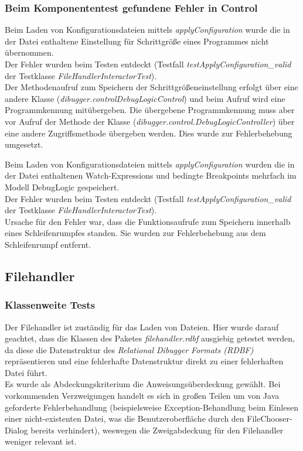 \documentclass[parskip=full]{scrartcl}
\begin{document}
\subsubsection{Beim Komponententest gefundene Fehler in Control}\label{fehlerInControl}
Beim Laden von Konfigurationsdateien mittels \textit{applyConfiguration} wurde die in der Datei enthaltene Einstellung für Schrittgröße eines Programmes nicht übernommen.\\
Der Fehler wurden beim Testen entdeckt (Testfall \textit{testApplyConfiguration\_valid} der Testklasse \textit{FileHandlerInteractorTest}).\\
Der Methodenaufruf zum Speichern der Schrittgrößeneinstellung erfolgt über eine andere Klasse (\textit{dibugger.controlDebugLogicControl}) und beim Aufruf wird eine Programmkennung mitübergeben.
Die übergebene Programmkennung muss aber vor Aufruf der Methode der Klasse (\textit{dibugger.control.DebugLogicController}) über eine andere Zugriffsmethode übergeben werden.
Dies wurde zur Fehlerbehebung umgesetzt.

Beim Laden von Konfigurationsdateien mittels \textit{applyConfiguration} wurden die in der Datei enthaltenen Watch-Expressions und bedingte Breakpoints mehrfach im Modell DebugLogic gespeichert.\\
Der Fehler wurden beim Testen entdeckt (Testfall \textit{testApplyConfiguration\_valid} der Testklasse \textit{FileHandlerInteractorTest}).\\
Ursache für den Fehler war, dass die Funktionsaufrufe zum Speichern innerhalb eines Schleifenrumpfes standen. 
Sie wurden zur Fehlerbehebung aus dem Schleifenrumpf entfernt.

\subsection{Filehandler}
\subsubsection{Klassenweite Tests}
Der Filehandler ist zuständig für das Laden von Dateien. Hier wurde darauf geachtet, dass die Klassen des Paketes \textit{filehandler.rdbf} ausgiebig getestet werden, da diese die Datenstruktur des \textit{Relational Dibugger Formats (RDBF)} repräsentieren und eine fehlerhafte Datenstruktur direkt zu einer fehlerhaften Datei führt.\\
Es wurde als Abdeckungskriterium die Anweisungsüberdeckung gewählt. Bei vorkommenden Verzweigungen handelt es sich in großen Teilen um von Java geforderte Fehlerbehandlung (beispielsweise Exception-Behandlung beim Einlesen einer nicht-existenten Datei, was die Benutzeroberfläche durch den FileChooser-Dialog bereits verhindert), weswegen die Zweigabdeckung für den Filehandler weniger relevant ist.
\end{document}
